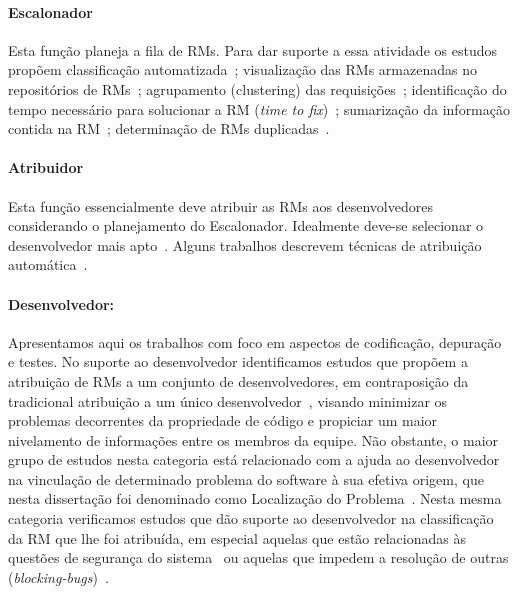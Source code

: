 

\paragraph{Escalonador}

Esta função planeja a fila de RMs. Para dar suporte a essa atividade os estudos
propõem classificação automatizada~\cite{gegick2010identifying,liu2014faceted,
    behl2014bug, chawla2015automated,tian2015automated}; visualização das RMs
armazenadas no repositórios de RMs~\cite{izquierdo2015gila}; agrupamento
(clustering) das requisições~\cite{liu2014faceted}; identificação do tempo
necessário para solucionar a RM (\textit{time to
    fix})~\cite{hosseini2012market, Bhattacharya:2011:BTP:1985441.1985472};
sumarização da informação contida na RM~\cite{mani2012ausum}; determinação de
RMs duplicadas~\cite{Sun2011, Wu2011a}.

\paragraph{Atribuidor}

Esta função essencialmente deve atribuir as RMs aos desenvolvedores
considerando o planejamento do Escalonador. Idealmente deve-se selecionar o
desenvolvedor mais apto~\cite{banitaan2013decoba}. Alguns trabalhos descrevem
técnicas de atribuição automática~\cite{banitaan2013decoba,
    shokripour2012automatic, somasundaram2012automatic, Naguib2013, Zhang2014,
    Zanetti2013}.

\paragraph{Desenvolvedor:}

Apresentamos aqui os trabalhos com foco em aspectos de co\-di\-fi\-ca\-ção,
depuração e testes. No suporte ao desenvolvedor identificamos estudos que
propõem a atribuição de RMs a um conjunto de desenvolvedores, em contraposição
da tradicional atribuição a um único desenvolvedor~\cite{banitaan2013decoba},
visando minimizar os pro\-ble\-mas decorrentes da propriedade de código e
propiciar um maior nivelamento de informações entre os membros da equipe. Não
obstante, o maior grupo de estudos nesta categoria está relacionado com a ajuda
ao desenvolvedor na vinculação de determinado problema do software à sua efetiva
origem, que nesta dissertação foi denominado como Localização do
Problema~\cite{corley2011recovering,Wong:2014:BBF:2705615.2706096,
    Thung:2014:BIT:2635868.2661678,Nguyen:2012:MAR:2393596.2393671,thung2013automatic,
    Romo:2015:TAT:2745802.2745833}. Nesta mesma categoria verificamos estudos
que dão suporte ao desenvolvedor na classificação da RM que lhe foi atribuída,
em especial aquelas que estão relacionadas às questões de segurança do
sistema~\cite{gegick2010identifying} ou aquelas que impedem a resolução de
outras (\textit{blocking-bugs})~\cite{ValdiviaGarcia:2014:CPB:2597073.2597099}.

